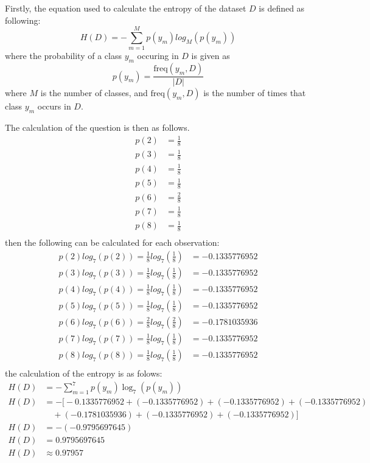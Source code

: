 \documentclass[10pt]{article}
\begin{document}
Firstly, the equation used to calculate the entropy of the dataset $D$ is defined as following:
\begin{equation*}
    H(D) = - \sum_{m=1}^{M} p(y_m)log_M \left( p(y_m) \right)
\end{equation*}
where the probability of a class $y_m$ occuring in $D$ is given as
\begin{equation*}
    p(y_m) = \frac{\text{freq}(y_m, D)}{|D|}
\end{equation*}
where $M$ is the number of classes, and $\text{freq}(y_m, D)$ is the number of times that class $y_m$
occurs in $D$.

The calculation of the question is then as follows.
\begin{align*}
    p(2) &= \frac{1}{8} \\
    p(3) &= \frac{1}{8} \\
    p(4) &= \frac{1}{8} \\
    p(5) &= \frac{1}{8} \\
    p(6) &= \frac{2}{8} \\
    p(7) &= \frac{1}{8} \\
    p(8) &= \frac{1}{8} \\
\end{align*}
then the following can be calculated for each observation:
\begin{align*}
    p(2) log_7 \left( p(2) \right) = \frac{1}{8} log_7 \left( \frac{1}{8} \right) &= -0.1335776952\\
    p(3) log_7 \left( p(3) \right) = \frac{1}{8} log_7 \left( \frac{1}{8} \right) &= -0.1335776952\\
    p(4) log_7 \left( p(4) \right) = \frac{1}{8} log_7 \left( \frac{1}{8} \right) &= -0.1335776952\\
    p(5) log_7 \left( p(5) \right) = \frac{1}{8} log_7 \left( \frac{1}{8} \right) &= -0.1335776952\\
    p(6) log_7 \left( p(6) \right) = \frac{2}{8} log_7 \left( \frac{2}{8} \right) &= -0.1781035936\\
    p(7) log_7 \left( p(7) \right) = \frac{1}{8} log_7 \left( \frac{1}{8} \right) &= -0.1335776952\\
    p(8) log_7 \left( p(8) \right) = \frac{1}{8} log_7 \left( \frac{1}{8} \right) &= -0.1335776952\\
\end{align*}
the calculation of the entropy is as folows:
\begin{align*}
    H(D) &= - \sum_{m=1}^{7} p(y_m) \log_7 \left( p(y_m) \right) \\
    H(D) &= - \big[ -0.1335776952 + (-0.1335776952) + (-0.1335776952) + (-0.1335776952)\\
    &\quad + (-0.1781035936) + (-0.1335776952) + (-0.1335776952)\big] \\
    H(D) &= - (-0.9795697645) \\
    H(D) &= 0.9795697645 \\
    H(D) &\approx 0.97957
\end{align*}
\end{document}
